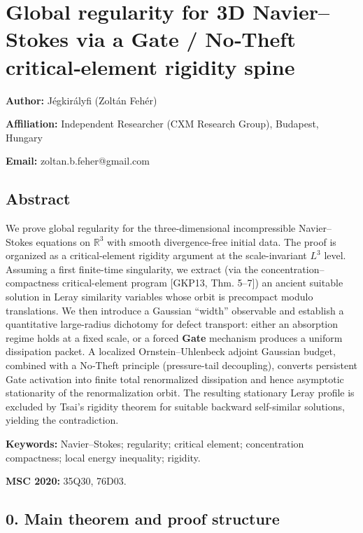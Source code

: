 \documentclass[
  11pt,
]{article}
\author{}
\date{}
\begin{document}
\hypertarget{global-regularity-for-3d-navierstokes-via-a-gate-notheft-criticalelement-rigidity-spine}{%
\section{Global regularity for 3D Navier--Stokes via a Gate / No‑Theft critical‑element rigidity spine}\label{global-regularity-for-3d-navierstokes-via-a-gate-notheft-criticalelement-rigidity-spine}}

\textbf{Author:} Jégkirályfi (Zoltán Fehér)

\textbf{Affiliation:} Independent Researcher (CXM Research Group), Budapest, Hungary

\textbf{Email:} zoltan.b.feher@gmail.com

\hypertarget{abstract}{%
\subsection{Abstract}\label{abstract}}

We prove global regularity for the three-dimensional incompressible Navier--Stokes equations on \(\mathbb R^3\) with smooth divergence-free initial data. The proof is organized as a critical-element rigidity argument at the scale-invariant \(L^3\) level. Assuming a first finite-time singularity, we extract (via the concentration--compactness critical-element program {[}GKP13, Thm. 5--7{]}) an ancient suitable solution in Leray similarity variables whose orbit is precompact modulo translations. We then introduce a Gaussian ``width'' observable and establish a quantitative large-radius dichotomy for defect transport: either an absorption regime holds at a fixed scale, or a forced \textbf{Gate} mechanism produces a uniform dissipation packet. A localized Ornstein--Uhlenbeck adjoint Gaussian budget, combined with a No‑Theft principle (pressure-tail decoupling), converts persistent Gate activation into finite total renormalized dissipation and hence asymptotic stationarity of the renormalization orbit. The resulting stationary Leray profile is excluded by Tsai's rigidity theorem for suitable backward self-similar solutions, yielding the contradiction.

\textbf{Keywords:} Navier--Stokes; regularity; critical element; concentration compactness; local energy inequality; rigidity.

\textbf{MSC 2020:} 35Q30, 76D03.

\hypertarget{main-theorem-and-proof-structure}{%
\subsection{0. Main theorem and proof structure}\label{main-theorem-and-proof-structure}}
\end{document}

